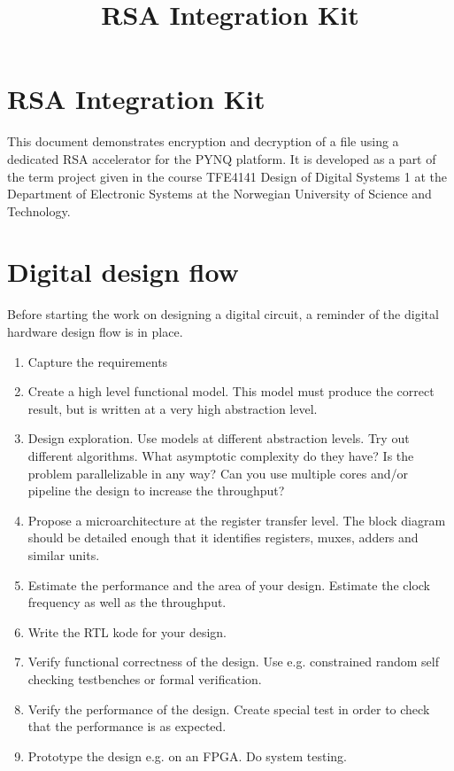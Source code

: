 \documentclass[11pt]{article}
\title{RSA Integration Kit}
\begin{document}
    
    
    \maketitle
    
    

    
    \section{RSA Integration Kit}\label{rsa-integration-kit}

This document demonstrates encryption and decryption of a file using a
dedicated RSA accelerator for the PYNQ platform. It is developed as a
part of the term project given in the course TFE4141 Design of Digital
Systems 1 at the Department of Electronic Systems at the Norwegian
University of Science and Technology.

    \section{Digital design flow}\label{digital-design-flow}

Before starting the work on designing a digital circuit, a reminder of
the digital hardware design flow is in place.

\begin{enumerate}
\def\labelenumi{\arabic{enumi})}
\item
  Capture the requirements
\item
  Create a high level functional model. This model must produce the
  correct result, but is written at a very high abstraction level.
\item
  Design exploration. Use models at different abstraction levels. Try
  out different algorithms. What asymptotic complexity do they have? Is
  the problem parallelizable in any way? Can you use multiple cores
  and/or pipeline the design to increase the throughput?
\item
  Propose a microarchitecture at the register transfer level. The block
  diagram should be detailed enough that it identifies registers, muxes,
  adders and similar units.
\item
  Estimate the performance and the area of your design. Estimate the
  clock frequency as well as the throughput.
\item
  Write the RTL kode for your design.
\item
  Verify functional correctness of the design. Use e.g. constrained
  random self checking testbenches or formal verification.
\item
  Verify the performance of the design. Create special test in order to
  check that the performance is as expected.
\item
  Prototype the design e.g. on an FPGA. Do system testing.
\end{enumerate}
\end{document}
